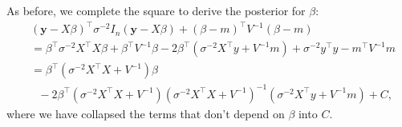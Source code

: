 \documentclass[letterpaper,11pt]{article}
\begin{document}
\begin{enumerate}
\begin{enumerate}
\begin{description}
      As before, we complete the square to derive the posterior for $\beta$:
      \begin{align*}
        &\left(\mathbf{y} - X\beta\right)^\intercal \sigma^{-2}I_n\left(\mathbf{y} - X\beta\right)
        + \left(\beta - m\right)^\intercal V^{-1}\left(\beta - m\right) \\
        &= \beta^\intercal \sigma^{-2}X^\intercal X \beta + \beta^\intercal V^{-1} \beta
          - 2\beta^\intercal\left(\sigma^{-2}X^\intercal y + V^{-1}m\right) +
          \sigma^{-2}y^\intercal y - m^\intercal V^{-1}m \\
        &= \beta^\intercal\left(
          \sigma^{-2}X^\intercal X + V^{-1}
          \right)\beta \\
        &~~~
          -2 \beta^\intercal          
          \left(
          \sigma^{-2}X^\intercal X + V^{-1}
          \right)
          \left(
          \sigma^{-2}X^\intercal X + V^{-1}
          \right)^{-1}
          \left(\sigma^{-2}X^\intercal y + V^{-1}m\right) + C,
      \end{align*}
      where we have collapsed the terms that don't depend on $\beta$ into $C$.


\end{description}
\end{enumerate}
\end{enumerate}
\end{document}
